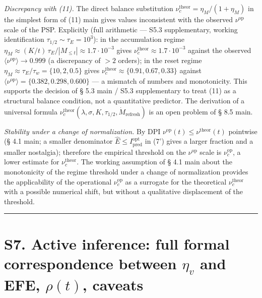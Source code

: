 \documentclass[pdflatex,sn-mathphys-ay]{sn-jnl}
\begin{document}
\emph{Discrepancy with (11).} The direct balance substitution \(\nu_c^{\text{theor}} = \eta_M/(1+\eta_M)\) in the simplest form of (11) main gives values inconsistent with the observed \(\nu^{\text{op}}\) scale of the PSP. Explicitly (full arithmetic --- S5.3 supplementary, working identification \(\tau_{1/2}\sim\tau_E=10^3\)): in the accumulation regime \(\eta_M \approx (K/t)\,\tau_E/|M_{\le t}| \approx 1.7\cdot10^{-3}\) gives \(\nu_c^{\text{theor}} \approx 1.7\cdot10^{-3}\) against the observed \(\langle\nu^{\text{op}}\rangle\to 0.999\) (a discrepancy of \(>2\) orders); in the reset regime \(\eta_M \approx \tau_E/\tau_w = \{10, 2, 0.5\}\) gives \(\nu_c^{\text{theor}} \approx \{0.91, 0.67, 0.33\}\) against \(\langle\nu^{\text{op}}\rangle = \{0.382, 0.298, 0.600\}\) --- a mismatch of numbers and monotonicity. This supports the decision of § 5.3 main / S5.3 supplementary to treat (11) as a structural balance condition, not a quantitative predictor. The derivation of a universal formula \(\nu_c^{\text{theor}}(\lambda, \sigma, K, \tau_{1/2}, \dot M_{\text{refresh}})\) is an open problem of § 8.5 main.



\emph{Stability under a change of normalization.} By DPI \(\nu^{\text{op}}(t) \le \nu^{\text{theor}}(t)\) pointwise (§ 4.1 main; a smaller denominator \(\hat E \le I_{\text{pred}}^{\text{opt}}\) in (7') gives a larger fraction and a smaller nostalgia); therefore the empirical threshold on the \(\nu^{\text{op}}\) scale is \(\nu_c^{\text{op}}\), a lower estimate for \(\nu_c^{\text{theor}}\). The working assumption of § 4.1 main about the monotonicity of the regime threshold under a change of normalization provides the applicability of the operational \(\nu_c^{\text{op}}\) as a surrogate for the theoretical \(\nu_c^{\text{theor}}\) with a possible numerical shift, but without a qualitative displacement of the threshold.



\begin{center}\rule{0.5\linewidth}{0.5pt}\end{center}



\section*{\texorpdfstring{S7. Active inference: full formal correspondence between \(\eta_v\) and EFE, \(\rho(t)\), caveats}{S7. Active inference: full formal correspondence between \textbackslash eta\_v and EFE, \textbackslash rho(t), caveats}}\label{s7.-active-inference-full-formal-correspondence-between-eta_v-and-efe-rhot-caveats}
\end{document}
